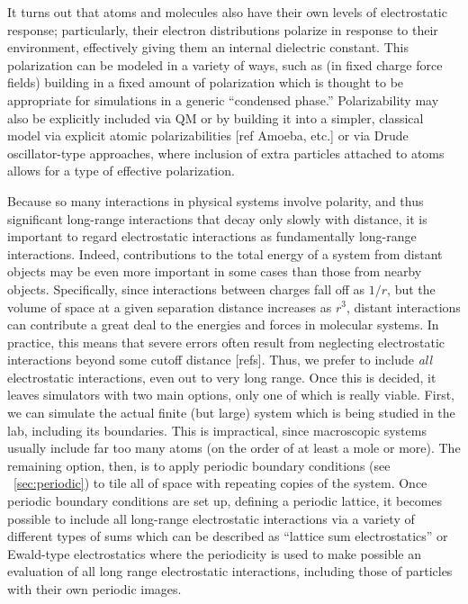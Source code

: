 \documentclass[9pt,bestpractices]{livecoms}
\begin{document}
It turns out that atoms and molecules also have their own levels of electrostatic response; particularly, their electron distributions polarize in response to their environment, effectively giving them an internal dielectric constant.
This polarization can be modeled in a variety of ways, such as (in fixed charge force fields) building in a fixed amount of polarization which is thought to be appropriate for simulations in a generic ``condensed phase.'' 
Polarizability may also be explicitly included via QM or by building it into a simpler, classical model via explicit atomic polarizabilities [ref Amoeba, etc.] or via Drude oscillator-type approaches, where inclusion of extra particles attached to atoms allows for a type of effective polarization.

Because so many interactions in physical systems involve polarity, and thus significant long-range interactions that decay only slowly with distance, it is important to regard electrostatic interactions as fundamentally long-range interactions.
Indeed, contributions to the total energy of a system from distant objects may be even more important in some cases than those from nearby objects.
Specifically, since interactions between charges fall off as $1/r$, but the volume of space at a given separation distance increases as $r^3$, distant interactions can contribute a great deal to the energies and forces in molecular systems.
In practice, this means that severe errors often result from neglecting electrostatic interactions beyond some cutoff distance [refs].
Thus, we prefer to include \emph{all} electrostatic interactions, even out to very long range.
Once this is decided, it  leaves simulators with two main options, only one of which is really viable.
First, we can simulate the actual finite (but large) system which is being studied in the lab, including its boundaries.
This is impractical, since macroscopic systems usually include far too many atoms (on the order of at least a mole or more).
The remaining option, then, is to apply periodic boundary conditions (see ~\ref{sec:periodic}) to tile all of space with repeating copies of the system.
Once periodic boundary conditions are set up, defining a periodic lattice, it becomes possible to include all long-range electrostatic interactions via a variety of different types of sums which can be described as ``lattice sum electrostatics'' or Ewald-type electrostatics where the periodicity is used to make possible an evaluation of all long range electrostatic interactions, including those of particles with their own periodic images.
\end{document}
